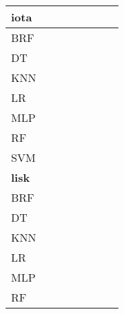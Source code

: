 \documentclass{article}
\begin{document}
{\begin{tabular}{|l|c|c|c|c|c|c|c|}
\hline
\textbf{iota} \\ \hline
BRF & \cellcolor{gray}  & \cellcolor{white}  & \cellcolor{white}  & \cellcolor{black}  & \cellcolor{white}  & \cellcolor{white}  & \cellcolor{white}  \\ 
DT & \cellcolor{white}  & \cellcolor{gray}  & \cellcolor{white}  & \cellcolor{black}  & \cellcolor{white}  & \cellcolor{white}  & \cellcolor{white}  \\ 
KNN & \cellcolor{white}  & \cellcolor{white}  & \cellcolor{gray}  & \cellcolor{black}  & \cellcolor{white}  & \cellcolor{white}  & \cellcolor{white}  \\ 
LR & \cellcolor{white}  & \cellcolor{white}  & \cellcolor{white}  & \cellcolor{gray}  & \cellcolor{white}  & \cellcolor{white}  & \cellcolor{white}  \\ 
MLP & \cellcolor{white}  & \cellcolor{white}  & \cellcolor{white}  & \cellcolor{black}  & \cellcolor{gray}  & \cellcolor{white}  & \cellcolor{white}  \\ 
RF & \cellcolor{white}  & \cellcolor{white}  & \cellcolor{white}  & \cellcolor{white}  & \cellcolor{black}  & \cellcolor{gray}  & \cellcolor{black}  \\ 
SVM & \cellcolor{white}  & \cellcolor{white}  & \cellcolor{white}  & \cellcolor{black}  & \cellcolor{white}  & \cellcolor{white}  & \cellcolor{gray}  \\ 
\hline
\textbf{lisk} \\ \hline
BRF & \cellcolor{gray}  & \cellcolor{white}  & \cellcolor{white}  & \cellcolor{white}  & \cellcolor{white}  & \cellcolor{white}  & \cellcolor{black}  \\ 
DT & \cellcolor{white}  & \cellcolor{gray}  & \cellcolor{white}  & \cellcolor{black}  & \cellcolor{white}  & \cellcolor{white}  & \cellcolor{black}  \\ 
KNN & \cellcolor{black}  & \cellcolor{white}  & \cellcolor{gray}  & \cellcolor{black}  & \cellcolor{black}  & \cellcolor{black}  & \cellcolor{black}  \\ 
LR & \cellcolor{white}  & \cellcolor{white}  & \cellcolor{white}  & \cellcolor{gray}  & \cellcolor{white}  & \cellcolor{white}  & \cellcolor{black}  \\ 
MLP & \cellcolor{white}  & \cellcolor{white}  & \cellcolor{white}  & \cellcolor{white}  & \cellcolor{gray}  & \cellcolor{white}  & \cellcolor{black}  \\ 
RF & \cellcolor{white}  & \cellcolor{white}  & \cellcolor{white}  & \cellcolor{white}  & \cellcolor{white}  & \cellcolor{gray}  & \cellcolor{black}  \\ 

\end{tabular}}
\end{document}
